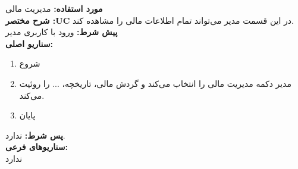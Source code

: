 \textbf{مورد استفاده:}
مدیریت مالی
\\
\textbf{شرح مختصر :UC}
در این قسمت مدیر می‌تواند تمام اطلاعات مالی را مشاهده ‌کند.
\\
\textbf{پيش شرط:}
ورود با کاربری مدیر
\\
\textbf{سناريو اصلی:}
\begin{enumerate}
	\item
	شروع
	\item
	مدیر دکمه مدیریت مالی را انتخاب می‌کند و گردش مالی، تاریخچه، ... را روئیت می‌کند.
	\item
	پایان
\end{enumerate}

\noindent
\textbf{پس شرط:}
ندارد.
\\
\textbf{سناريوهای فرعی:}
\\
ندارد

